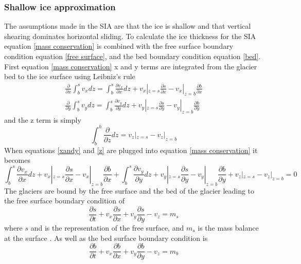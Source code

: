 \documentclass{article}
\begin{document}
\subsubsection{Shallow ice approximation}
The assumptions made in the SIA are that the ice is shallow and that vertical shearing dominates horizontal sliding. To calculate the ice thickness for the SIA equation \ref{mass conservation} is combined with the free surface boundary condition equation \ref{free surface}, and the bed boundary condition equation \ref{bed}\citep{LEMEUR2004, Greve2009}. First equation \ref{mass conservation} x and y terms are integrated from the glacier bed to the ice surface using Leibniz's rule
\begin{subequations} \label{xandy}
\begin{gather}
    \frac{\partial}{\partial x}\int_b^s v_x dz = \int_b^s \frac{\partial v_x}{\partial x}dz+v_x|_{z=s}\frac{\partial s}{\partial x}-v_x|_{z=b}\frac{\partial b}{\partial x} \\
    \frac{\partial}{\partial y}\int_b^s v_y dz = \int_b^s \frac{\partial v_y}{\partial y}dz+v_y|_{z=s}\frac{\partial s}{\partial y}-v_y|_{z=b}\frac{\partial b}{\partial y}
\end{gather}
\end{subequations}
and the z term is simply
\begin{equation}\label{z}
    \int_b^h\frac{\partial}{\partial z}dz = v_z|_{z=s}-v_z|_{z=b}
\end{equation}
When equations \ref{xandy} and \ref{z} are plugged into equation \ref{mass conservation} it becomes
\begin{equation}
    \int_b^s \frac{\partial v_x}{\partial x}dz+v_x|_{z=s}\frac{\partial s}{\partial x}-v_x|_{z=b}\frac{\partial b}{\partial x}+\int_b^s \frac{\partial v_y}{\partial y}dz+v_y|_{z=s}\frac{\partial s}{\partial y}-v_y|_{z=b}\frac{\partial b}{\partial y}+v_z|_{z=s}-v_z|_{z=b} = 0
\end{equation}
The glaciers are bound by the free surface and the bed of the glacier leading to the free surface boundary condition of 
\begin{equation}\label{free surface}
\frac{\partial s}{\partial t} + v_x \frac{\partial s}{\partial x}+ v_y \frac{\partial s}{\partial y} -v_z = m_s
\end{equation}
where $s$ and is the representation of the free surface, and $m_s$ is the mass balance at the surface \citep{LEMEUR2004, Greve2009}. As well as the bed surface boundary condition is
\begin{equation}\label{bed}
\frac{\partial b}{\partial t} + v_x \frac{\partial b}{\partial x}+ v_y \frac{\partial b}{\partial y} -v_z = m_b
\end{equation}
\end{document}
